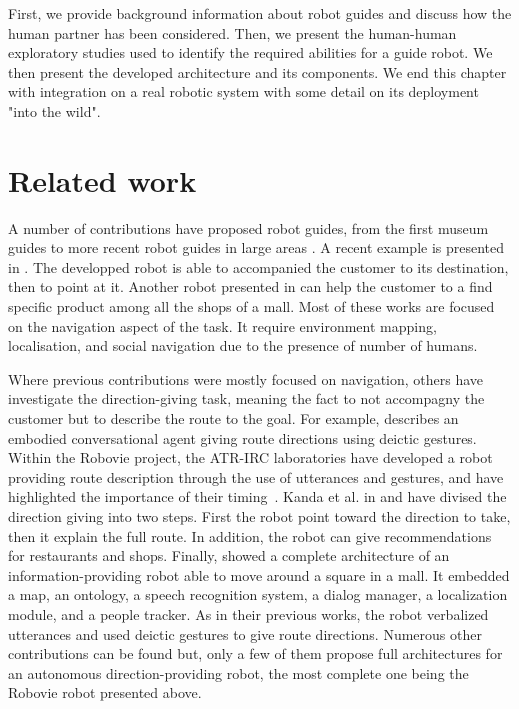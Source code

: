 First, we provide background information about robot guides and discuss how the human partner has been considered. Then, we present the human-human exploratory studies used to identify the required abilities for a guide robot. We then present the developed architecture and its components. We end this chapter with integration on a real robotic system with some detail on its deployment "into the wild".

\section{Related work}

A number of contributions have proposed robot guides, from the first museum guides \cite{burgard_1999_museum, siegwart_2003_robox, clodic_2006_rackham} to more recent robot guides in large areas \cite{bauer_2009_autonomous, triebel_2016_spencer}. A recent example is presented in \cite{chen_2017_robots}. The developped robot is able to accompanied the customer to its destination, then to point at it. Another robot presented in \cite{gross_2009_toomas} can help the customer to a find specific product among all the shops of a mall. Most of these works are focused on the navigation aspect of the task. It require environment mapping, localisation, and social navigation due to the presence of number of humans.

Where previous contributions were mostly focused on navigation, others have investigate the direction-giving task, meaning the fact to not accompagny the customer but to describe the route to the goal. For example, \cite{cassell_2007_trading} describes an embodied conversational agent giving route directions using deictic gestures. Within the Robovie project, the ATR-IRC laboratories have developed a robot providing route description through the use of utterances and gestures, and have highlighted the importance of their timing~\cite{okuno_2009_providing}. Kanda et al. in \cite{kanda_2009_affective} and \cite{kanda_2010_communication} have divised the direction giving into two steps. First the robot point toward the direction to take, then it explain the full route. In addition, the robot can give recommendations for restaurants and shops. Finally, \cite{satake_2015_should} showed a complete architecture of an information-providing robot able to move around a square in a mall. It embedded a map, an ontology, a speech recognition system, a dialog manager, a localization module, and a people tracker. As in their previous works, the robot verbalized utterances and used deictic gestures to give route directions. Numerous other contributions can be found but, only a few of them propose full architectures for an autonomous direction-providing robot, the most complete one being the Robovie robot presented above. 

